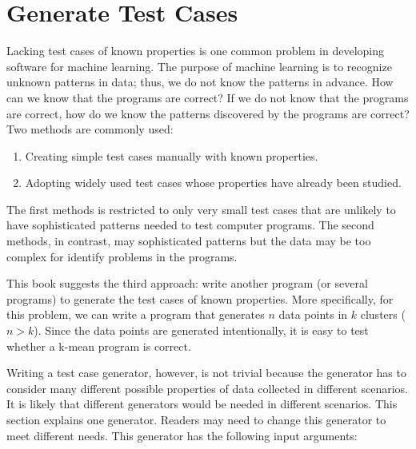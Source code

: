 \section{Generate Test Cases}

Lacking test cases of known properties is one common problem in
developing software for machine learning.  The purpose of machine
learning is to recognize unknown patterns in data; thus, we do not
know the patterns in advance.  How can we know that the programs are
correct?  If we do not know that the programs are correct, how do we
know the patterns discovered by the programs are correct?  Two methods
are commonly used:
\begin{enumerate}
\item Creating simple test cases manually with known properties.

\item Adopting widely used test cases whose properties have already
  been studied.
\end{enumerate}
The first methods is restricted to only very small test cases that are
unlikely to have sophisticated patterns needed to test computer
programs.  The second methods, in contrast, may sophisticated patterns
but the data may be too complex for identify problems in the programs.



This book suggests the third approach: write another program (or
several programs) to generate the test cases of known properties.
More specifically, for this problem, we can write a program that
generates $n$ data points in $k$ clusters ($n > k$).  Since the data
points are generated intentionally, it is easy to test whether a
k-mean program is correct.

Writing a test case generator, however, is not trivial because the
generator has to consider many different possible properties of data
collected in different scenarios. It is likely that different
generators would be needed in different scenarios. This section
explains one generator. Readers may need to change this generator to
meet different needs.  This generator has the following input
arguments:

